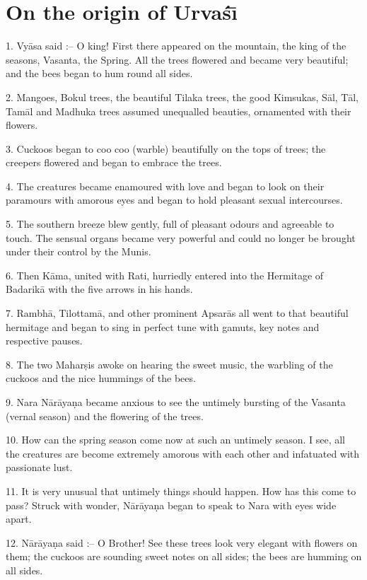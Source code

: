 \chapter{On the origin of Urva\'s\={\i}}

1. Vy\=asa said :-- O king! First there appeared on the mountain, the king of the seasons, Vasanta, the Spring. All the trees flowered and became very beautiful; and the bees began to hum round all sides.

2. Mangoes, Bokul trees, the beautiful Tilaka trees, the good Kimsukas, S\=al, T\=al, Tam\=al and Madhuka trees assumed unequalled beauties, ornamented with their flowers.

3. Cuckoos began to coo coo (warble) beautifully on the tops of trees; the creepers flowered and began to embrace the trees.

4. The creatures became enamoured with love and began to look on their paramours with amorous eyes and began to hold pleasant sexual intercourses.

5. The southern breeze blew gently, full of pleasant odours and agreeable to touch. The sensual organs became very powerful and could no longer be brought under their control by the Munis.

6. Then K\=ama, united with Rati, hurriedly entered into the Hermitage of Badarik\=a with the five arrows in his hands.

7. Rambh\=a, Tilottam\=a, and other prominent Apsar\=as all went to that beautiful hermitage and began to sing in perfect tune with gamuts, key notes and respective pauses.

8. The two Mahar\d{s}is awoke on hearing the sweet music, the warbling of the cuckoos and the nice hummings of the bees.

9. Nara N\=ar\=aya\d{n}a became anxious to see the untimely bursting of the Vasanta (vernal season) and the flowering of the trees.

10. How can the spring season come now at such an untimely season. I see, all the creatures are become extremely amorous with each other and infatuated with passionate lust.

11. It is very unusual that untimely things should happen. How has this come to pass? Struck with wonder, N\=ar\=aya\d{n}a began to speak to Nara with eyes wide apart.

12. N\=ar\=aya\d{n}a said :-- O Brother! See these trees look very elegant with flowers on them; the cuckoos are sounding sweet notes on all sides; the bees are humming on all sides.

